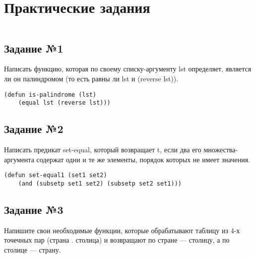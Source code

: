\chapter{Практические задания}

\vspace{4mm}
\hfill
\begin{minipage}{0.92\linewidth}
\begin{lstlisting}
\end{lstlisting}
\end{minipage}

\section{Задание №1}

Написать функцию, которая по своему списку-аргументу lst определяет, является
ли он палиндромом (то есть равны ли lst и (reverse lst)).

\vspace{4mm}
\hfill
\begin{minipage}{0.92\linewidth}
\begin{lstlisting}
(defun is-palindrome (lst)
    (equal lst (reverse lst)))
\end{lstlisting}
\end{minipage}

\section{Задание №2}

Написать предикат set-equal, который возвращает t, если два его
множества-аргумента содержат одни и те же элементы, порядок которых не имеет
значения.

\vspace{4mm}
\begin{minipage}{0.92\linewidth}
\begin{lstlisting}
(defun set-equal1 (set1 set2)
    (and (subsetp set1 set2) (subsetp set2 set1)))
\end{lstlisting}
\end{minipage}

\section{Задание №3}

Напишите свои необходимые функции, которые обрабатывают таблицу из 4-х точечных
пар (страна . столица) и возвращают по стране --- столицу, а по столице ---
страну.

